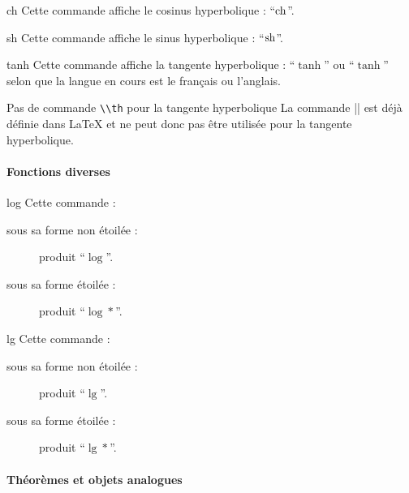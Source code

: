 \begin{docCommand}{ch}{}
  Cette commande affiche le cosinus hyperbolique : \enquote{$\operatorname{ch}$}.
\end{docCommand}

\begin{docCommand}{sh}{}
  Cette commande affiche le sinus hyperbolique : \enquote{$\operatorname{sh}$}.
\end{docCommand}

\begin{docCommand}{tanh}{}
  Cette commande affiche la tangente hyperbolique : \enquote{$\tanh$} ou
  \enquote{$\tanh$} selon que la
  langue en cours est le français ou l'anglais.
  \begin{dbremark}{Pas de commande \protect\lstinline+\\th+ pour la tangente
      hyperbolique}{}
    La commande |\th| est déjà définie dans \LaTeX{} et ne peut donc pas être
    utilisée pour la tangente hyperbolique.
  \end{dbremark}
\end{docCommand}

\paragraph{Fonctions diverses}

\begin{docCommand}{log}{}
  Cette commande :
  \begin{description}
  \item[sous sa forme non étoilée :] produit \enquote{$\log$}.
  \item[sous sa forme étoilée :] produit \enquote{$\log*$}.
  \end{description}
\end{docCommand}

\begin{docCommand}{lg}{}
  Cette commande :
  \begin{description}
  \item[sous sa forme non étoilée :] produit \enquote{$\lg$}.
  \item[sous sa forme étoilée :] produit \enquote{$\lg*$}.
  \end{description}
\end{docCommand}

\paragraph{Théorèmes et objets analogues}


